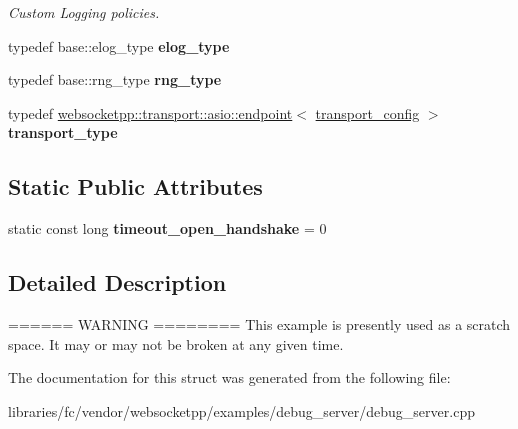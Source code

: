 \begin{DoxyCompactItemize}
\begin{DoxyCompactList}\small\item\em Custom Logging policies. \end{DoxyCompactList}\item 
\mbox{\label{structdebug__custom_ab0bee0a06071b6a8af852df4adde4b66}} 
typedef base\+::elog\+\_\+type {\bfseries elog\+\_\+type}
\item 
\mbox{\label{structdebug__custom_a67265ed1bcec76c010af7c2605786ddf}} 
typedef base\+::rng\+\_\+type {\bfseries rng\+\_\+type}
\item 
\mbox{\label{structdebug__custom_aa4bb700a5ed29f8b2a274b900b72dc67}} 
typedef \mbox{\hyperlink{classwebsocketpp_1_1transport_1_1asio_1_1endpoint}{websocketpp\+::transport\+::asio\+::endpoint}}$<$ \mbox{\hyperlink{structdebug__custom_1_1transport__config}{transport\+\_\+config}} $>$ {\bfseries transport\+\_\+type}
\end{DoxyCompactItemize}
\subsection*{Static Public Attributes}
\begin{DoxyCompactItemize}
\item 
\mbox{\label{structdebug__custom_a059d642975e6a25ffa4b43883543461f}} 
static const long {\bfseries timeout\+\_\+open\+\_\+handshake} = 0
\end{DoxyCompactItemize}


\subsection{Detailed Description}
====== W\+A\+R\+N\+I\+NG ======== This example is presently used as a scratch space. It may or may not be broken at any given time. 

The documentation for this struct was generated from the following file\+:\begin{DoxyCompactItemize}
\item 
libraries/fc/vendor/websocketpp/examples/debug\+\_\+server/debug\+\_\+server.\+cpp\end{DoxyCompactItemize}
